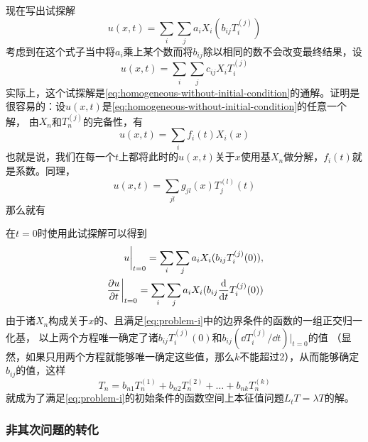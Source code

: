 \documentclass[UTF8]{ctexart}
\begin{document}
现在写出试探解
\[
    u(x, t) = \sum_i \sum_j a_i X_i (b_{ij} T_i^{(j)})
\]
考虑到在这个式子当中将$a_i$乘上某个数而将$b_{ij}$除以相同的数不会改变最终结果，设
\[
    u(x, t) = \sum_i \sum_j c_{ij} X_i T_i^{(j)}
\]
实际上，这个试探解是\eqref{eq:homogeneous-without-initial-condition}的通解。证明是很容易的：设$u(x,t)$是\eqref{eq:homogeneous-without-initial-condition}的任意一个解，
由$X_n$和$T_n^{(j)}$的完备性，有
\[
    u(x, t) = \sum_i f_i(t) X_i(x) 
\]
也就是说，我们在每一个$t$上都将此时的$u(x, t)$关于$x$使用基$X_n$做分解，$f_i(t)$就是系数。同理，
\[
    u(x, t) = \sum_{jl} g_{jl}(x) T_j^{(l)}(t) 
\]
那么就有

在$t=0$时使用此试探解可以得到
\[
    \begin{split}
        \eval{u}_{t=0} = \sum_i \sum_j a_i X_i (b_{ij} T_i^{(j)}(0)), \\
        \eval{\pdv{u}{t}}_{t=0} = \sum_i \sum_j a_i X_i (b_{ij} \dv{t} T_i^{(j)}(0)) 
    \end{split}
\]
由于诸$X_n$构成关于$x$的、且满足\eqref{eq:problem-i}中的边界条件的函数的一组正交归一化基，
以上两个方程唯一确定了诸$b_{ij} T_i^{(j)}(0)$和$b_{ij} (\dd T_i^{(j)} / \dd t)|_{t=0}$的值
（显然，如果只用两个方程就能够唯一确定这些值，那么$k$不能超过2），从而能够确定$b_{ij}$的值，这样
\[
    T_n = b_{n1} T_n^{(1)} + b_{n2} T_n^{(2)} + \ldots + b_{nk} T_n^{(k)}
\]
就成为了满足\eqref{eq:problem-i}的初始条件的函数空间上本征值问题$L_t T = \lambda T$的解。


\subsubsection{非其次问题的转化}\label{sec:from-inhomogeneous-to-sv}
\end{document}
